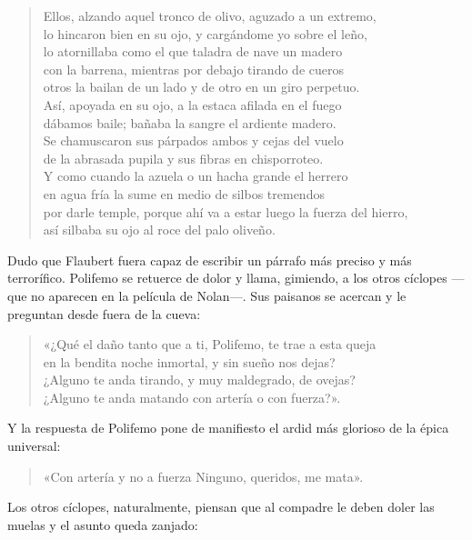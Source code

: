 \documentclass[11pt,a4paper]{article}
\begin{document}
\begin{verse}
Ellos, alzando aquel tronco de olivo, aguzado a un extremo,\\
lo hincaron bien en su ojo, y cargándome yo sobre el leño,\\
lo atornillaba como el que taladra de nave un madero\\
con la barrena, mientras por debajo tirando de cueros\\
otros la bailan de un lado y de otro en un giro perpetuo.\\
Así, apoyada en su ojo, a la estaca afilada en el fuego\\
dábamos baile; bañaba la sangre el ardiente madero.\\
Se chamuscaron sus párpados ambos y cejas del vuelo\\
de la abrasada pupila y sus fibras en chisporroteo.\\
Y como cuando la azuela o un hacha grande el herrero\\
en agua fría la sume en medio de silbos tremendos\\
por darle temple, porque ahí va a estar luego la fuerza del hierro,\\
así silbaba su ojo al roce del palo oliveño.
\end{verse}

Dudo que Flaubert fuera capaz de escribir un párrafo más preciso y más terrorífico. Polifemo se retuerce de dolor y llama, gimiendo, a los otros cíclopes ---que no aparecen en la película de Nolan---. Sus paisanos se acercan y le preguntan desde fuera de la cueva:

\begin{verse}
«¿Qué el daño tanto que a ti, Polifemo, te trae a esta queja\\
en la bendita noche inmortal, y sin sueño nos dejas?\\
¿Alguno te anda tirando, y muy maldegrado, de ovejas?\\
¿Alguno te anda matando con artería o con fuerza?».
\end{verse}

Y la respuesta de Polifemo pone de manifiesto el ardid más glorioso de la épica universal:

\begin{verse}
«Con artería y no a fuerza Ninguno, queridos, me mata».
\end{verse}

Los otros cíclopes, naturalmente, piensan que al compadre le deben doler las muelas y el asunto queda zanjado:
\end{document}

